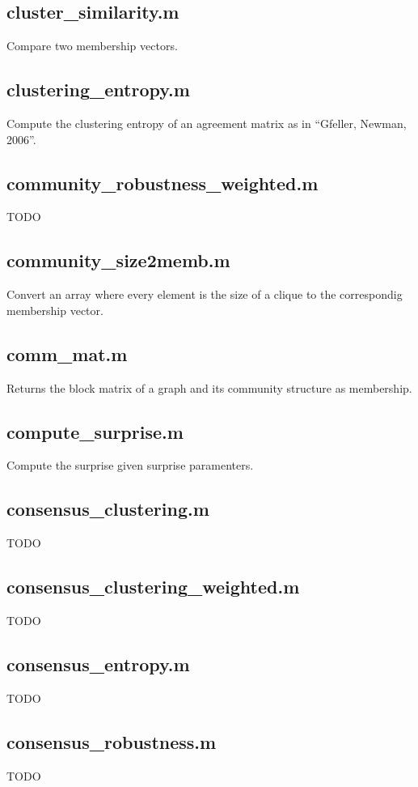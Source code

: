 \begin{itemize}[<+->]
  \subsection*{cluster\_similarity.m} Compare two membership vectors.

  \subsection*{clustering\_entropy.m} Compute the clustering entropy of an
  agreement matrix as in ``Gfeller, Newman, 2006''.

  \subsection*{community\_robustness\_weighted.m} TODO

  \subsection*{community\_size2memb.m} Convert an array where every element
  is the size of a clique to the correspondig membership vector.

  \subsection*{comm\_mat.m} Returns the block matrix of a graph and its
  community structure as membership.

  \subsection*{compute\_surprise.m} Compute the surprise given surprise
  paramenters.

  \subsection*{consensus\_clustering.m} TODO

  \subsection*{consensus\_clustering\_weighted.m} TODO

  \subsection*{consensus\_entropy.m} TODO

  \subsection*{consensus\_robustness.m} TODO


\end{itemize}
